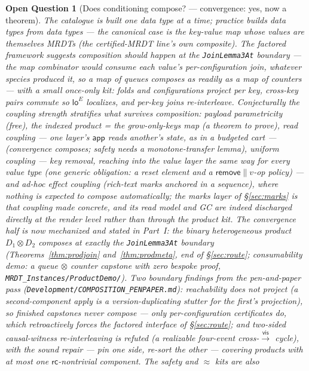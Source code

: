 \documentclass[11pt]{article}
\newtheorem{openq}[theorem]{Open Question}
\newcommand{\vis}{\xrightarrow{\mathsf{vis}}}
\newcommand{\rcrel}{\mathsf{rc}}                 %
\newcommand{\loE}[1]{\mathsf{lo}^{#1}}
\newcommand{\lean}[1]{\texttt{#1}}
\newcommand{\eqobs}{\approx}
\newcommand{\app}{\mathsf{app}}
\begin{document}
\begin{openq}[Does conditioning compose? --- convergence: yes, now a theorem]
\label{oq:compose}
The catalogue is built one data type at a time; practice builds data types
from data types --- the canonical case is the key-value map whose values are
themselves MRDTs (the certified-MRDT line's own composite). The factored
framework suggests composition should happen at the \lean{JoinLemma3At}
boundary --- the map combinator would consume each value's per-configuration
join, whatever species produced it, so a map of \emph{queues} composes as
readily as a map of counters --- with a small once-only kit: folds and
configurations project per key, cross-key pairs commute so $\loE{E}$
localizes, and per-key joins re-interleave. Conjecturally the coupling
strength stratifies what survives composition: payload parametricity (free),
the indexed product = the grow-only-keys map (a theorem to prove), read
coupling --- one layer's $\app$ reads another's state, as in a budgeted
cart --- (convergence composes; safety needs a monotone-transfer lemma),
uniform coupling --- key \emph{removal}, reaching into the value layer the
same way for every value type (one generic obligation: a reset element and
a $\mathsf{remove} \parallel v$-op policy) --- and ad-hoc effect coupling
(rich-text marks anchored in a sequence), where nothing is expected to
compose automatically; the marks layer of \S\ref{sec:marks} is that
coupling made concrete, and its read model and GC are indeed
discharged directly at the render level rather than through the
product kit. The convergence half is now mechanized and stated in
Part~I: the binary heterogeneous product $D_1 \otimes D_2$ composes at
exactly the \lean{JoinLemma3At} boundary
(Theorems~\ref{thm:prodjoin} and~\ref{thm:prodmeta}, end of
\S\ref{sec:route}; consumability demo: a queue $\otimes$ counter
capstone with zero bespoke proof, \lean{MRDT\_Instances/ProductDemo/}). Two
boundary findings from the pen-and-paper pass
(\lean{Development/COMPOSITION\_PENPAPER.md}): \emph{reachability does
not project} (a second-component apply is a version-duplicating stutter
for the first's projection), so finished capstones never compose ---
only per-configuration certificates do, which retroactively forces the
factored interface of \S\ref{sec:route}; and \emph{two-sided causal-witness
re-interleaving is refuted} (a realizable four-event cross-$\vis$ cycle),
with the sound repair --- pin one side, re-sort the other --- covering
products with at most one $\rcrel$-nontrivial component. The safety and $\eqobs$ kits are also

\end{openq}
\end{document}
